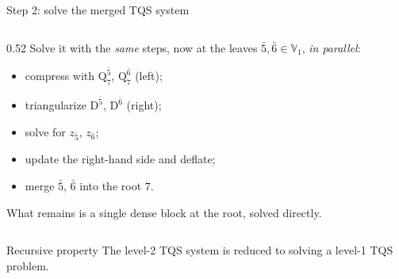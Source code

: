 \documentclass[aspectratio=169,11pt]{beamer}
\begin{document}
\begin{frame}{Step 2: solve the merged TQS system}
\begin{columns}[c]
\begin{column}{0.52\textwidth}
\vspace{1mm}
Solve it with the \emph{same} steps, now at the leaves $\bar{5},\bar{6}\in\mathbb{V}_1$,
\emph{in parallel}:
\begin{itemize}
\setlength{\itemsep}{0pt}
\item[1a] compress with $\mathrm{Q}^{\bar{5}}_7$, $\mathrm{Q}^{\bar{6}}_7$ (left);
\item[1b] triangularize $\mathrm{D}^{\bar{5}}$, $\mathrm{D}^{\bar{6}}$ (right);
\item[1c] solve for $z_{\bar{5}}$, $z_{\bar{6}}$;
\item[1d] update the right-hand side and deflate;
\item[1e] merge $\bar{5}$, $\bar{6}$ into the root $7$.
\end{itemize}
What remains is a single dense block at the root, solved directly.
\end{column}
\end{columns}

\vspace{1mm}
\begin{block}{Recursive property}
The level-2 TQS system is reduced to solving a level-1 TQS problem.
\end{block}
\end{frame}
\end{document}

